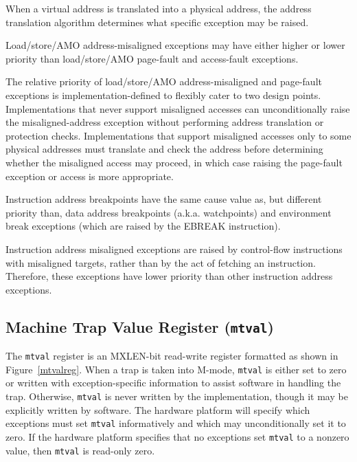 When a virtual address is translated into
a physical address, the address translation
algorithm determines what specific exception may be raised.

Load/store/AMO address-misaligned exceptions may have
either higher or lower priority than load/store/AMO page-fault and
access-fault exceptions.
\begin{commentary}
The relative priority of load/store/AMO address-misaligned and page-fault
exceptions is implementation-defined to flexibly cater to two design points.
Implementations that never support misaligned accesses can unconditionally
raise the misaligned-address exception without performing address translation
or protection checks.
Implementations that support misaligned accesses only to some physical
addresses must translate and check the address before determining whether the
misaligned access may proceed, in which case raising the page-fault exception
or access is more appropriate.
\end{commentary}

\begin{commentary}
Instruction address breakpoints have the same cause value as, but
different priority than, data address breakpoints (a.k.a. watchpoints)
and environment break exceptions (which are raised by the EBREAK instruction).
\end{commentary}

\begin{commentary}
Instruction address misaligned exceptions are raised by control-flow
instructions with misaligned targets, rather than by the act of fetching an
instruction.  Therefore, these exceptions have lower priority than other
instruction address exceptions.
\end{commentary}

\FloatBarrier
\subsection{Machine Trap Value Register ({\tt mtval})}

The {\tt mtval} register is an MXLEN-bit read-write register formatted as shown
in Figure~\ref{mtvalreg}.  When a trap is taken into M-mode, {\tt mtval} is
either set to zero or written with exception-specific information to assist
software in handling the trap.  Otherwise, {\tt mtval} is never written by the
implementation, though it may be explicitly written by software.  The hardware
platform will specify which exceptions must set {\tt mtval} informatively and
which may unconditionally set it to zero.
If the hardware platform specifies that no exceptions set {\tt mtval} to a
nonzero value, then {\tt mtval} is read-only zero.

